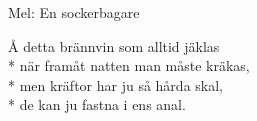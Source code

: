 \begin{SongText}[Kräftvisa]
    \begin{SongInfo}
        Mel: En sockerbagare
    \end{SongInfo}
    \begin{SongVerse}
        Å detta brännvin som alltid jäklas\\*%
        när framåt natten man måste kräkas,\\*%
        men kräftor har ju så hårda skal,\\*%
        de kan ju fastna i ens anal.
    \end{SongVerse}
\end{SongText}
